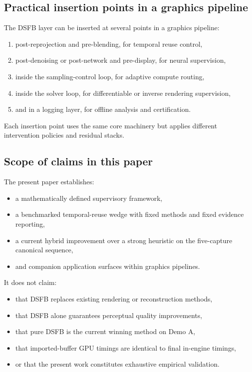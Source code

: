\documentclass[11pt,letterpaper]{article}
\theoremstyle{gcresult}
\theoremstyle{definition}
\begin{document}

\subsection{Practical insertion points in a graphics pipeline}

The DSFB layer can be inserted at several points in a graphics pipeline:
\begin{enumerate}[leftmargin=1.5em]
    \item post-reprojection and pre-blending, for temporal reuse control,
    \item post-denoising or post-network and pre-display, for neural supervision,
    \item inside the sampling-control loop, for adaptive compute routing,
    \item inside the solver loop, for differentiable or inverse rendering supervision,
    \item and in a logging layer, for offline analysis and certification.
\end{enumerate}

Each insertion point uses the same core machinery but applies different intervention policies and residual stacks.


\subsection{Scope of claims in this paper}

The present paper establishes:
\begin{itemize}[leftmargin=1.5em]
    \item a mathematically defined supervisory framework,
    \item a benchmarked temporal-reuse wedge with fixed methods and fixed evidence reporting,
    \item a current hybrid improvement over a strong heuristic on the five-capture canonical sequence,
    \item and companion application surfaces within graphics pipelines.
\end{itemize}

It does not claim:
\begin{itemize}[leftmargin=1.5em]
    \item that DSFB replaces existing rendering or reconstruction methods,
    \item that DSFB alone guarantees perceptual quality improvements,
    \item that pure DSFB is the current winning method on Demo A,
    \item that imported-buffer GPU timings are identical to final in-engine timings,
    \item or that the present work constitutes exhaustive empirical validation.
\end{itemize}
\end{document}
